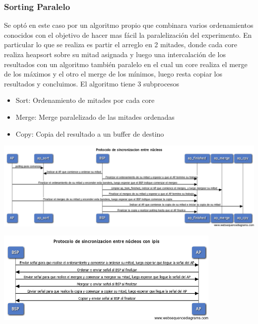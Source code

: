 \documentclass{beamer}
\begin{document}
	\begin{frame}
		\frametitle{Sorting Paralelo}
		Se optó en este caso por un algoritmo propio que combinara varios ordenamientos conocidos con el objetivo de hacer mas fácil la paralelización del experimento. En particular lo que se realiza es partir el arreglo en 2 mitades, donde cada core realiza heapsort sobre su mitad asignada y luego una intercalación de los resultados con un algoritmo también paralelo en el cual un core realiza el merge de los máximos y el otro el merge de los mínimos, luego resta copiar los resultados y concluimos.
		El algoritmo tiene 3 subprocesos
		\begin{itemize}
			\item Sort: Ordenamiento de mitades por cada core
			\item Merge: Merge paralelizado de las mitades ordenadas
			\item Copy: Copia del resultado a un buffer de destino
		\end{itemize}
	\end{frame}

	\begin{frame}
		\begin{center}
	        \includegraphics[scale=0.28]{images/sync-sorting-seq.png}
	    \end{center}
	\end{frame}

	\begin{frame}
	    \begin{center}
	        \includegraphics[height=4.5cm]{images/ipis-sorting-seq.png}
	    \end{center}
	\end{frame}
\end{document}
